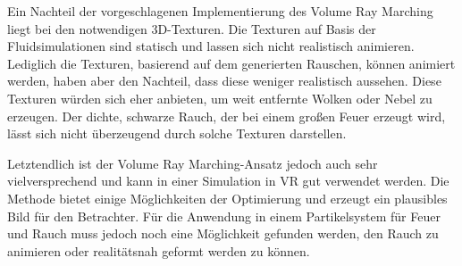 Ein Nachteil der vorgeschlagenen Implementierung des Volume Ray Marching liegt bei den notwendigen 3D-Texturen. 
Die Texturen auf Basis der Fluidsimulationen sind statisch und lassen sich nicht realistisch animieren. Lediglich die Texturen, basierend auf dem
generierten Rauschen, können animiert werden, haben aber den Nachteil, dass diese weniger realistisch aussehen. Diese Texturen würden sich eher anbieten,
um weit entfernte Wolken oder Nebel zu erzeugen. Der dichte, schwarze Rauch, der bei einem großen Feuer erzeugt wird, lässt sich nicht überzeugend 
durch solche Texturen darstellen. 

Letztendlich ist der Volume Ray Marching-Ansatz jedoch auch sehr vielversprechend und kann in einer Simulation in VR gut verwendet werden. 
Die Methode bietet einige Möglichkeiten der Optimierung und erzeugt ein plausibles Bild für den Betrachter. 
Für die Anwendung in einem Partikelsystem für Feuer und Rauch muss jedoch noch eine Möglichkeit gefunden werden, den Rauch zu animieren oder 
realitätsnah geformt werden zu können. 